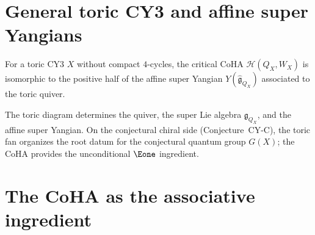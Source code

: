 \section{General toric CY3 and affine super Yangians}
\label{sec:general-toric-yangian}

\begin{theorem}
\label{thm:rsyz}
For a toric CY3 $X$ without compact $4$-cycles, the critical CoHA $\mathcal{H}(Q_X, W_X)$ is isomorphic to the positive half of the affine super Yangian $Y(\widehat{\mathfrak{g}}_{Q_X})$ associated to the toric quiver.
\end{theorem}

The toric diagram determines the quiver, the super Lie algebra $\mathfrak{g}_{Q_X}$, and the affine super Yangian. On the conjectural chiral side (Conjecture~CY-C), the toric fan organizes the root datum for the conjectural quantum group $G(X)$; the CoHA provides the unconditional $\Eone$ ingredient.

\section{The CoHA as the associative ingredient}
\label{sec:coha-e1}

